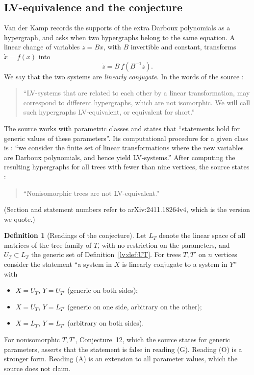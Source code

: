 \documentclass[11pt,a4paper]{article}
\theoremstyle{definition}
\newtheorem{definition}[theorem]{Definition}
\theoremstyle{remark}
\begin{document}
\subsection{LV-equivalence and the conjecture}

Van der Kamp \cite{lv:K2025} records the supports of the extra Darboux polynomials as a hypergraph, and asks when two hypergraphs belong to the same equation. A linear change of variables $z=Bx$, with $B$ invertible and constant, transforms $\dot x=f(x)$ into
\begin{equation}
 \dot z=B\,f(B^{-1}z).
 \label{lv:eq:conjugacy}
\end{equation}
We say that the two systems are \emph{linearly conjugate}. In the words of the source \cite[\S3, before Example~11]{lv:K2025}:
\begin{quote}
``LV-systems that are related to each other by a linear transformation, may correspond to different hypergraphs, which are not isomorphic. We will call such hypergraphs LV-equivalent, or equivalent for short.''
\end{quote}
The source works with parametric classes and states \cite[\S1]{lv:K2025} that ``statements hold for generic values of these parameters''. Its computational procedure for a given class is \cite[\S4, opening paragraph]{lv:K2025}: ``we consider the finite set of linear transformations where the new variables are Darboux polynomials, and hence yield LV-systems.'' After computing the resulting hypergraphs for all trees with fewer than nine vertices, the source states \cite[\S5, Conjecture~12]{lv:K2025}:
\begin{quote}
``Nonisomorphic trees are not LV-equivalent.''
\end{quote}
(Section and statement numbers refer to arXiv:2411.18264v4, which is the version we quote.)

\begin{definition}[Readings of the conjecture]
\label{lv:def:readings}
Let $L_T$ denote the linear space of all matrices of the tree family of $T$, with no restriction on the parameters, and $U_T\subset L_T$ the generic set of Definition~\ref{lv:def:UT}. For trees $T,T'$ on $n$ vertices consider the statement ``a system in $X$ is linearly conjugate to a system in $Y$'' with
\begin{itemize}
\item[(G)] $X=U_T$, $Y=U_{T'}$ (generic on both sides);
\item[(O)] $X=U_T$, $Y=L_{T'}$ (generic on one side, arbitrary on the other);
\item[(A)] $X=L_T$, $Y=L_{T'}$ (arbitrary on both sides).
\end{itemize}
For nonisomorphic $T,T'$, Conjecture~12, which the source states for generic parameters, asserts that the statement is false in reading (G). Reading (O) is a stronger form. Reading (A) is an extension to all parameter values, which the source does not claim.
\end{definition}
\end{document}
